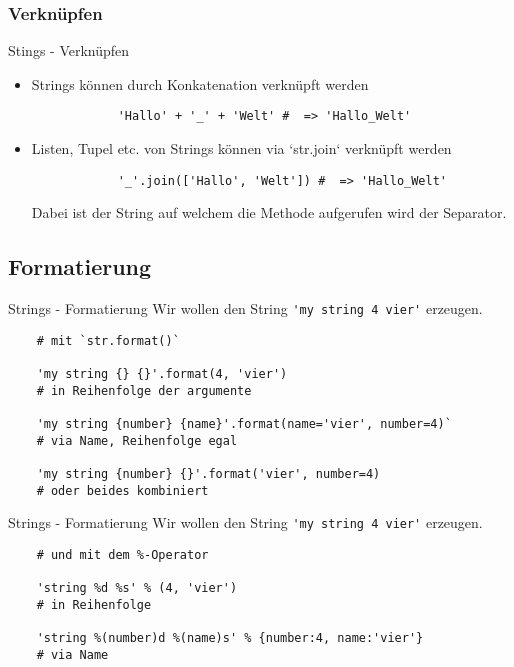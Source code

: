 \documentclass[]{tudbeamer}
\newcommand{\codeline}[1]{\colorbox{codegray}{\lstinline{#1}}}
\begin{document}
\subsubsection{Verknüpfen}
\begin{frame}[fragile]{Stings - Verknüpfen}
	\begin{itemize}
	    \item Strings können durch Konkatenation verknüpft werden \\
	    \begin{lstlisting}
			'Hallo' + '_' + 'Welt' #  => 'Hallo_Welt'
		\end{lstlisting}  
	    \item Listen, Tupel etc. von Strings können via `str.join` verknüpft werden \\
	    \begin{lstlisting}
			'_'.join(['Hallo', 'Welt']) #  => 'Hallo_Welt'
		\end{lstlisting}
	    Dabei ist der String auf welchem die Methode aufgerufen wird der Separator.
	\end{itemize}
\end{frame}


\subsection{Formatierung}
\begin{frame}[fragile]{Strings - Formatierung}
	Wir wollen den String \codeline{'my string 4 vier'} erzeugen.

	\begin{lstlisting}
	# mit `str.format()`  

	'my string {} {}'.format(4, 'vier')
	# in Reihenfolge der argumente

	'my string {number} {name}'.format(name='vier', number=4)`
	# via Name, Reihenfolge egal

	'my string {number} {}'.format('vier', number=4)
	# oder beides kombiniert
	\end{lstlisting}
\end{frame}

\begin{frame}[fragile]{Strings - Formatierung}
	Wir wollen den String \codeline{'my string 4 vier'} erzeugen.
	\begin{lstlisting}
	# und mit dem %-Operator

	'string %d %s' % (4, 'vier')
	# in Reihenfolge

	'string %(number)d %(name)s' % {number:4, name:'vier'}
	# via Name
	\end{lstlisting}
\end{frame}
\end{document}
